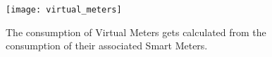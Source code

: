 \begin{figure}[ht!]
    \centering
    \texttt{[image: virtual\_meters]}
    \caption{The consumption of Virtual Meters gets calculated from the consumption of their associated Smart Meters.}
    \label{fig:virtual_meters_consumption}
\end{figure}